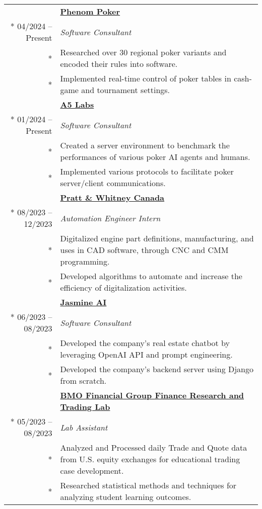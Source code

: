 \documentclass{article}
\begin{document}
	\begin{tabularx}{\textwidth}{r X}
		& \textbf{\href{https://www.phenompoker.com/}{Phenom Poker}} \\*
		04/2024 -- Present & \textit{Software Consultant} \\*
		& {\small Researched over 30 regional poker variants and encoded their rules into software.} \\*
		& {\small Implemented real-time control of poker tables in cash-game and tournament settings.} \\
		\addlinespace
		& \textbf{\href{https://a5labs.co/}{A5 Labs}} \\*
		01/2024 -- Present & \textit{Software Consultant} \\*
		& {\small Created a server environment to benchmark the performances of various poker AI agents and humans.} \\*
		& {\small Implemented various protocols to facilitate poker server/client communications.} \\
		\addlinespace
		& \textbf{\href{https://www.prattwhitney.com/}{Pratt \& Whitney Canada}} \\*
		08/2023 -- 12/2023 & \textit{Automation Engineer Intern} \\*
		& {\small Digitalized engine part definitions, manufacturing, and uses in CAD software, through CNC and CMM programming.} \\*
		& {\small Developed algorithms to automate and increase the efficiency of digitalization activities.} \\
		\iftoggle{verbose}{
			\addlinespace
			& \textbf{\href{https://jasminechatbot.com/}{Jasmine AI}} \\*
			06/2023 -- 08/2023 & \textit{Software Consultant} \\*
			& {\small Developed the company's real estate chatbot by leveraging OpenAI API and prompt engineering.} \\*
			& {\small Developed the company's backend server using Django from scratch.} \\
		}{}
		\addlinespace
		& \textbf{\href{https://inside.rotman.utoronto.ca/financelab/}{BMO Financial Group Finance Research and Trading Lab}} \\*
		05/2023 -- 08/2023 & \textit{Lab Assistant} \\*
		& {\small Analyzed and Processed daily Trade and Quote data from U.S. equity exchanges for educational trading case development.} \\*
		& {\small Researched statistical methods and techniques for analyzing student learning outcomes.} \\

\end{tabularx}
\end{document}
